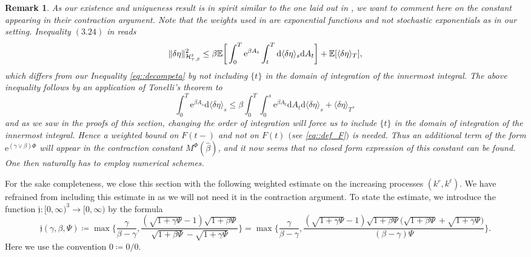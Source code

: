 \documentclass[10pt]{article} %
\newtheorem{remark}[theorem]{Remark}
\newcommand\cH{\mathcal H}
\newcommand{\smalltext}[1]{\text{\fontsize{4}{4}\selectfont$#1$}}
\def \E{\mathbb{E}}
\def\d{\mathrm{d}}
\begin{document}
\begin{remark}\label{rem::discussion_constants}
	As our existence and uniqueness result is in spirit similar to the one laid out in {\rm\cite{papapantoleon2018existence}}, we want to comment here on the constant appearing in their contraction argument. Note that the weights used in {\rm\cite{papapantoleon2018existence}} are exponential functions and not stochastic exponentials as in our setting. {\rm Inequality $(3.24)$} in {\rm\cite{papapantoleon2018existence}} reads
	\begin{equation*}
		\|\delta\eta\|^2_{\cH^\smalltext{2}_{\smalltext{T}\smalltext{,}\beta}} \leq \beta \E \bigg[ \int_0^T \mathrm{e}^{\beta A_t} \int_{t}^T \d \langle \delta\eta \rangle_s \d A_t \bigg] + \E [ \langle \delta\eta \rangle_T ],
	\end{equation*}
	which differs from our {\rm Inequality \eqref{eq::decompeta}} by not including $\{t\}$ in the domain of integration of the innermost integral. The above inequality follows by an application of Tonelli's theorem to
	\begin{equation*}
		\int_0^T \mathrm{e}^{\beta A_s} \d \langle \delta\eta \rangle_s 
		\leq \beta \int_0^T\int_0^s \mathrm{e}^{\beta A_t} \d A_t \d \langle \delta\eta \rangle_s + \langle \delta\eta \rangle_T,
	\end{equation*} 
	and as we saw in the proofs of this section, changing the order of integration will force us to include $\{t\}$ in the domain of integration of the innermost integral. Hence a weighted bound on $F(t-)$ and not on $F(t)$ $($see \eqref{eq::def_F}$)$ is needed. Thus an additional term of the form $\mathrm{e}^{(\gamma\lor\beta)\Phi}$ will appear in the contraction constant $M^\Phi(\hat\beta)$, and it now seems that no closed form expression of this constant can be found. One then naturally has to employ numerical schemes.
\end{remark}

For the sake completeness, we close this section with the following weighted estimate on the increasing processes $(k^r,k^\ell)$. We have refrained from including this estimate in  as we will not need it in the contraction argument. To state the estimate, we introduce the function $\mathfrak{j} : [0,\infty)^3 \longrightarrow [0,\infty)$ by the formula
\begin{equation*}
	\mathfrak{j}(\gamma,\beta,\Psi) \coloneqq \max\Bigg\{\frac{\gamma}{\beta-\gamma}, \frac{(\sqrt{1+\gamma \Psi} - 1)\sqrt{1+\beta \Psi}}{\sqrt{1+\beta \Psi} - \sqrt{1+\gamma \Psi}}\Bigg\} = \max\Bigg\{\frac{\gamma}{\beta-\gamma}, \frac{(\sqrt{1+\gamma \Psi} - 1)\sqrt{1+\beta \Psi}\big(\sqrt{1+\beta \Psi}+\sqrt{1+\gamma \Psi}\big)}{(\beta-\gamma)\Psi}\Bigg\}.
\end{equation*}
Here we use the convention $0 \coloneqq 0/0$. 
\end{document}
